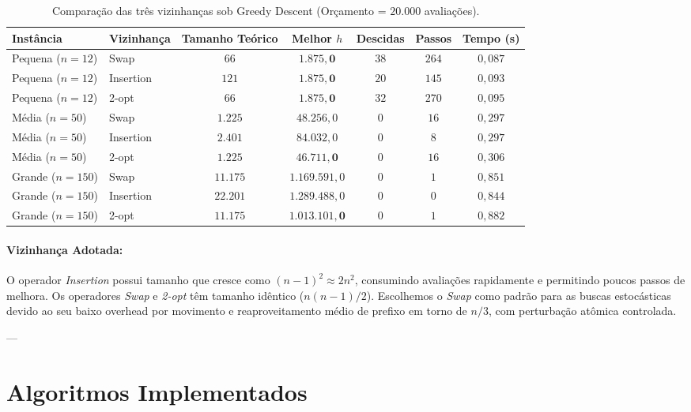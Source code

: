 \documentclass[11pt,a4paper]{article}
\begin{document}
\begin{table}[htbp]
\centering
\small
\caption{Comparação das três vizinhanças sob Greedy Descent (Orçamento = $20.000$ avaliações).}
\label{tab:t2}
\begin{tabular}{llccccc}
\toprule
\textbf{Instância} & \textbf{Vizinhança} & \textbf{Tamanho Teórico} & \textbf{Melhor $h$} & \textbf{Descidas} & \textbf{Passos} & \textbf{Tempo (s)} \\
\midrule
Pequena ($n=12$) & Swap      & $66$    & $\mathbf{1.875,0}$ & $38$ & $264$ & $0,087$ \\
Pequena ($n=12$) & Insertion & $121$   & $\mathbf{1.875,0}$ & $20$ & $145$ & $0,093$ \\
Pequena ($n=12$) & 2-opt     & $66$    & $\mathbf{1.875,0}$ & $32$ & $270$ & $0,095$ \\
\midrule
Média ($n=50$)   & Swap      & $1.225$ & $48.256,0$         & $0$  & $16$  & $0,297$ \\
Média ($n=50$)   & Insertion & $2.401$ & $84.032,0$         & $0$  & $8$   & $0,297$ \\
Média ($n=50$)   & 2-opt     & $1.225$ & $\mathbf{46.711,0}$ & $0$  & $16$  & $0,306$ \\
\midrule
Grande ($n=150$) & Swap      & $11.175$ & $1.169.591,0$     & $0$  & $1$   & $0,851$ \\
Grande ($n=150$) & Insertion & $22.201$ & $1.289.488,0$     & $0$  & $0$   & $0,844$ \\
Grande ($n=150$) & 2-opt     & $11.175$ & $\mathbf{1.013.101,0}$ & $0$  & $1$   & $0,882$ \\
\bottomrule
\end{tabular}
\end{table}

\paragraph{Vizinhança Adotada:} O operador \textit{Insertion} possui tamanho que cresce como $(n-1)^2 \approx 2n^2$, consumindo avaliações rapidamente e permitindo poucos passos de melhora. Os operadores \textit{Swap} e \textit{2-opt} têm tamanho idêntico ($n(n-1)/2$). Escolhemos o \textit{Swap} como padrão para as buscas estocásticas devido ao seu baixo overhead por movimento e reaproveitamento médio de prefixo em torno de $n/3$, com perturbação atômica controlada.

---

\section{Algoritmos Implementados}
\end{document}
